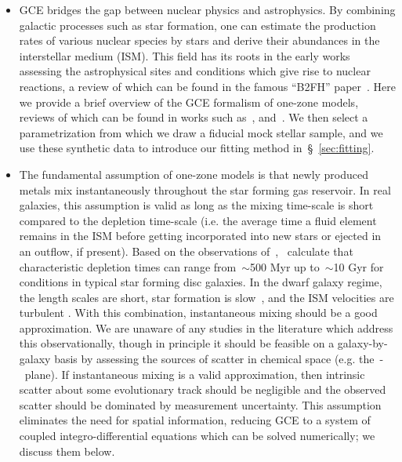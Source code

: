\documentclass[ms.tex]{subfiles}
\begin{document}
\begin{itemize}

	\item GCE bridges the gap between nuclear physics and astrophysics.
	By combining galactic processes such as star formation, one can estimate
	the production rates of various nuclear species by stars and derive their
	abundances in the interstellar medium (ISM).
	This field has its roots in the early works assessing the astrophysical
	sites and conditions which give rise to nuclear reactions, a review of
	which can be found in the famous ``B2FH'' paper~\citep{Burbidge1957}.
	Here we provide a brief overview of the GCE formalism of one-zone models,
	reviews of which can be found in works such as~\citet{Tinsley1980},
	\citet{Pagel2009} and~\citet{Matteucci2012, Matteucci2021}.
	We then select a parametrization from which we draw a fiducial mock stellar
	sample, and we use these synthetic data to introduce our fitting method
	in~\S~\ref{sec:fitting}.

	\item The fundamental assumption of one-zone models is that newly produced
	metals mix instantaneously throughout the star forming gas reservoir.
	In real galaxies, this assumption is valid as long as the mixing time-scale
	is short compared to the depletion time-scale (i.e. the average time a
	fluid element remains in the ISM before getting incorporated into new
	stars or ejected in an outflow, if present).
	Based on the observations of~\citet{Leroy2008},~\citet*{Weinberg2017}
	calculate that characteristic depletion times can range from~$\sim$500 Myr
	up to~$\sim$10 Gyr for conditions in typical star forming disc galaxies.
	In the dwarf galaxy regime, the length scales are short, star formation
	is slow~\citep{Hudson2015}, and the ISM velocities are turbulent
	\citep{Dutta2009, Stilp2013, Schleicher2016}.
	With this combination, instantaneous mixing should be a good approximation.
	We are unaware of any studies in the literature which address this
	observationally, though in principle it should be feasible on a
	galaxy-by-galaxy basis by assessing the sources of scatter in chemical
	space (e.g. the~\afe-\feh~plane).
	If instantaneous mixing is a valid approximation, then intrinsic scatter
	about some evolutionary track should be negligible and the observed scatter
	should be dominated by measurement uncertainty.
	This assumption eliminates the need for spatial information, reducing GCE
	to a system of coupled integro-differential equations which can be solved
	numerically; we discuss them below.

\end{itemize}
\end{document}
